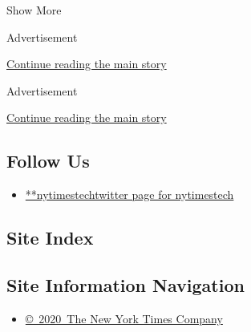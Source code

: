 Show More

Advertisement

\protect\hyperlink{after-mid2}{Continue reading the main story}

Advertisement

\protect\hyperlink{after-mktg}{Continue reading the main story}

\hypertarget{follow-us}{%
\subsection{Follow Us}\label{follow-us}}

\begin{itemize}
\tightlist
\item
  \href{https://twitter.com/nytimestech}{**nytimestechtwitter page for
  nytimestech}
\end{itemize}

\hypertarget{site-index}{%
\subsection{Site Index}\label{site-index}}

\hypertarget{site-information-navigation}{%
\subsection{Site Information
Navigation}\label{site-information-navigation}}

\begin{itemize}
\tightlist
\item
  \href{https://help.nytimes3xbfgragh.onion/hc/en-us/articles/115014792127-Copyright-notice}{©~2020~The
  New York Times Company}
\end{itemize}

